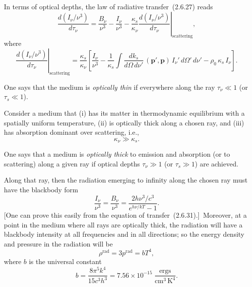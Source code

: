 In terms of optical depths, the law of radiative transfer~(2.6.27) reads
%
\begin{equation}
\tag{2.6.31}
\frac{d(I_\nu/\nu^3)}{d\tau_\nu}
= \frac{B_\nu}{\nu^3} - \frac{I_\nu}{\nu^3}
  - \frac{\kappa_s}{\kappa_\nu}
  \left.\frac{d(I_\nu/\nu^3)}{d\tau_\nu}\right|_{\text{scattering}},
\end{equation}
%
where
%
\begin{equation}
\tag{2.6.32}
\left.\frac{d(I_\nu/\nu^3)}{d\tau_\nu}\right|_{\text{scattering}}
= \frac{\kappa_s}{\kappa_\nu}\left[\frac{I_\nu}{\nu^3} - \frac{1}{\kappa_s}
  \int \frac{dk_s}{d\Omega\,d\nu'}\,
  (\mathbf{p}',\mathbf{p})\,I_\nu'\,d\Omega'\,d\nu'
  - \rho_0\,\kappa_s\,I_\nu \right].
\end{equation}


One says that the medium is \emph{optically thin} if everywhere along
the ray $\tau_\nu \ll 1$ (or $\tau_s \ll 1$).

Consider a medium that (i) has its matter in thermodynamic equilibrium with
a spatially uniform temperature, (ii) is optically thick along a chosen ray, and
(iii) has absorption dominant over scattering, i.e.,
%
\begin{equation}
\tag{2.6.33}
\kappa_\nu \gg \kappa_s.
\end{equation}

One says that a medium is \emph{optically thick} to emission and absorption (or to
scattering) along a given ray if optical depths $\tau_\nu \gg 1$
(or $\tau_s \gg 1$) are achieved.

\medskip
\noindent
Along that ray, then the radiation emerging to infinity along the chosen ray must
have the blackbody form
%
\begin{equation}
\tag{2.6.34}
\frac{I_\nu}{\nu^3} = \frac{B_\nu}{\nu^3}
= \frac{2h\nu^3/c^3}{e^{h\nu/kT} - 1}.
\end{equation}
%
[One can prove this easily from the equation of transfer~(2.6.31).]\
Moreover, at a point in the medium where all rays are optically thick, the
radiation will have a blackbody intensity at all frequencies and in all
directions; so the energy density and pressure in the radiation will be
%
\begin{equation}
\tag{2.6.35}
\rho^{\text{rad}} = 3p^{\text{rad}} = bT^4,
\end{equation}
%
where $b$ is the universal constant
%
\begin{equation}
\tag{2.6.36}
b = \frac{8\pi^5 k^4}{15c^3 h^3}
  = 7.56 \times 10^{-15}\;\frac{\text{ergs}}{\text{cm}^3\,\text{K}^4}.
\end{equation}

